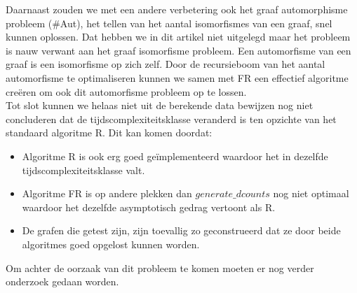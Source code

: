 \documentclass[twoside]{article}
\begin{document}
\begin{multicols}{2}
Daarnaast zouden we met een andere verbetering ook het graaf automorphisme probleem (#Aut), het tellen van het aantal isomorfismes van een graaf, snel kunnen oplossen. Dat hebben we in dit artikel niet uitgelegd maar het probleem is nauw verwant aan het graaf isomorfisme probleem. Een automorfisme van een graaf is een isomorfisme op zich zelf. Door de recursieboom van het aantal automorfisme te optimaliseren kunnen we samen met FR een effectief algoritme cre\"eren om ook dit automorfisme probleem op te lossen.\cite{slides_aut}\\

Tot slot kunnen we helaas niet uit de berekende data bewijzen nog niet concluderen dat de tijdscomplexiteitsklasse veranderd is ten opzichte van het standaard algoritme R. Dit kan komen doordat:
\begin{itemize}
\item Algoritme R is ook erg goed ge\"implementeerd waardoor het in dezelfde tijdscomplexiteitsklasse valt.
\item Algoritme FR is op andere plekken dan $generate\_dcounts$ nog niet optimaal waardoor het dezelfde asymptotisch gedrag vertoont als R.
\item De grafen die getest zijn, zijn toevallig zo geconstrueerd dat ze door beide algoritmes goed opgelost kunnen worden.
\end{itemize}
Om achter de oorzaak van dit probleem te komen moeten er nog verder onderzoek gedaan worden.





\end{multicols}


\newpage
\end{document}
